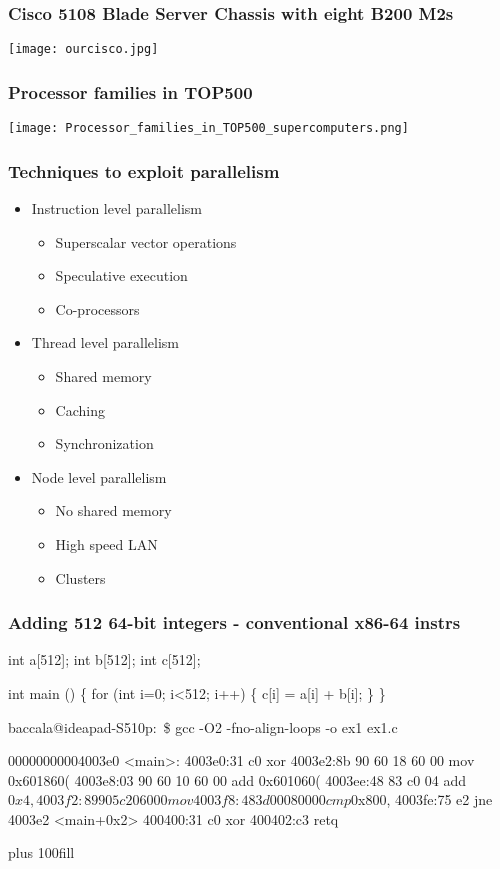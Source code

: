 \documentclass{beamer}
\begin{document}
\begin{frame}
\frametitle{Cisco 5108 Blade Server Chassis with eight B200 M2s}
\texttt{[image: ourcisco.jpg]}
\end{frame}

\begin{frame}
\frametitle{Processor families in TOP500}
\texttt{[image: Processor\_families\_in\_TOP500\_supercomputers.png]}
\end{frame}

\begin{frame}
\frametitle{Techniques to exploit parallelism}
\begin{itemize}
\item Instruction level parallelism
\begin{itemize}
\item Superscalar vector operations
\item Speculative execution
\item Co-processors
\end{itemize}
\item Thread level parallelism
\begin{itemize}
\item Shared memory
\item Caching
\item Synchronization
\end{itemize}
\item Node level parallelism
\begin{itemize}
\item No shared memory
\item High speed LAN
\item Clusters
\end{itemize}
\end{itemize}
\end{frame}

\begin{frame}[fragile]
\frametitle{Adding 512 64-bit integers - conventional x86-64 instrs}
\begin{semiverbatim}
\tiny
int a[512];
int b[512];
int c[512];

int main () \{
  for (int i=0; i<512; i++) \{
    c[i] = a[i] + b[i];
  \}
\}


baccala@ideapad-S510p:~\$ gcc -O2 -fno-align-loops -o ex1 ex1.c


00000000004003e0 <main>:
4003e0:31 c0                xor    %
4003e2:8b 90 60 18 60 00    mov    0x601860(%
4003e8:03 90 60 10 60 00    add    0x601060(%
4003ee:48 83 c0 04          add    $0x4,%
4003f2:89 90 5c 20 60 00    mov    %
4003f8:48 3d 00 08 00 00    cmp    $0x800,%
4003fe:75 e2                jne    4003e2 <main+0x2>
400400:31 c0                xor    %
400402:c3                   retq   

\end{semiverbatim}
\vskip 0pt plus 100fill
\end{frame}
\end{document}
